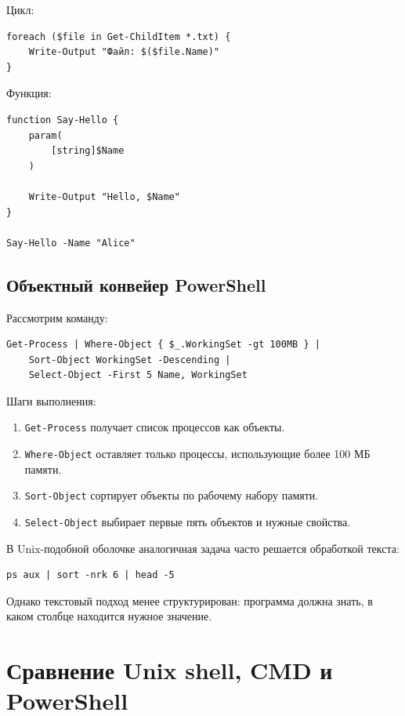\documentclass[12pt,a4paper]{article}
\begin{document}
Цикл:

\begin{lstlisting}
foreach ($file in Get-ChildItem *.txt) {
    Write-Output "Файл: $($file.Name)"
}
\end{lstlisting}

Функция:

\begin{lstlisting}
function Say-Hello {
    param(
        [string]$Name
    )

    Write-Output "Hello, $Name"
}

Say-Hello -Name "Alice"
\end{lstlisting}

\subsection{Объектный конвейер PowerShell}

Рассмотрим команду:

\begin{lstlisting}
Get-Process | Where-Object { $_.WorkingSet -gt 100MB } |
    Sort-Object WorkingSet -Descending |
    Select-Object -First 5 Name, WorkingSet
\end{lstlisting}

Шаги выполнения:
\begin{enumerate}
    \item \texttt{Get-Process} получает список процессов как объекты.
    \item \texttt{Where-Object} оставляет только процессы, использующие более 100 МБ памяти.
    \item \texttt{Sort-Object} сортирует объекты по рабочему набору памяти.
    \item \texttt{Select-Object} выбирает первые пять объектов и нужные свойства.
\end{enumerate}

В Unix-подобной оболочке аналогичная задача часто решается обработкой текста:

\begin{lstlisting}
ps aux | sort -nrk 6 | head -5
\end{lstlisting}

Однако текстовый подход менее структурирован: программа должна знать, в каком столбце находится нужное значение.

\section{Сравнение Unix shell, CMD и PowerShell}
\end{document}
